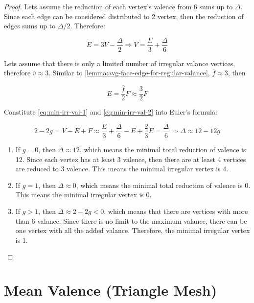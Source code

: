 \begin{proof}
    Lets assume the reduction of each vertex's valence from 6 sums up to $\Delta$. Since each edge can be considered distributed to 2 vertex, then the reduction of edges sums up to $\Delta/2$. Therefore:

    \begin{equation}
        E = 3V - \frac{\Delta}{2} \Rightarrow V = \frac{E}{3} + \frac{\Delta}{6}
        \label{eq:min-irr-val-1}
    \end{equation}

    Lets assume that there is only a limited number of irregular valance vertices, therefore $\overline{v} \approx 3$. Similar to \autoref{lemma:avg-face-edge-for-regular-valance}, $\overline{f} \approx 3$, then

    \begin{equation}        
        E = \frac{\overline{f}}{2}F \approx \frac{3}{2} F
        \label{eq:min-irr-val-2}
    \end{equation}

    Constitute \autoref{eq:min-irr-val-1} and \autoref{eq:min-irr-val-2} into Euler's formula:

    \begin{equation}
        2 - 2g = V - E + F \approx \frac{E}{3} + \frac{\Delta}{6} - E + \frac{2}{3}E = \frac{\Delta}{6}
        \Rightarrow \Delta \approx 12 - 12g
    \end{equation}

    \begin{enumerate}
        \item If $g = 0$, then $\Delta \approx 12$, which means the minimal total reduction of valence is 12. Since each vertex has at least 3 valence, then there are at least 4 vertices are reduced to 3 valence. This means the minimal irregular vertex is 4.
        \item If $g = 1$, then $\Delta \approx 0$, which means the minimal total reduction of valence is 0. This means the minimal irregular vertex is 0.
        \item If $g > 1$, then $\Delta \approx 2 - 2g < 0$, which means that there are vertices with more than 6 valance. Since there is no limit to the maximum valance, there can be one vertex with all the added valance. Therefore, the minimal irregular vertex is 1.
    \end{enumerate}
\end{proof}

\section{Mean Valence (Triangle Mesh)}

